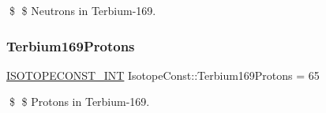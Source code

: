\$ \$ Neutrons in Terbium-\/169. \mbox{\label{group___isotope_const-_terbium-_tb169_gac985549900a1838eaeb6dfa70e6d2bb7}} 
\subsubsection{\texorpdfstring{Terbium169\+Protons}{Terbium169Protons}}
{\footnotesize\ttfamily \mbox{\hyperlink{group___isotope_const-_macros_ga5f18360b3e99483a35c32d789e62621c}{I\+S\+O\+T\+O\+P\+E\+C\+O\+N\+S\+T\+\_\+\+I\+NT}} Isotope\+Const\+::\+Terbium169\+Protons = 65}

\$ \$ Protons in Terbium-\/169. 
